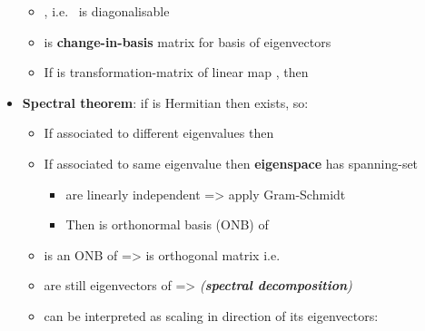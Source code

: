 \begin{itemize}
        \begin{itemize}

          \item
                , i.e.~ is diagonalisable
          \item
                 is \textbf{change-in-basis} matrix for
                basis
                 of
                eigenvectors
          \item
                If  is transformation-matrix of linear
                map , then
        \end{itemize}
  \item
        \textbf{Spectral theorem}: if  is Hermitian then
         exists, so:

        \begin{itemize}

          \item
                If  associated to different
                eigenvalues then 
          \item
                If associated to same eigenvalue \iMbox{\lambda} then
                \textbf{eigenspace}  has spanning-set

                \begin{itemize}

                  \item
                         are linearly
                        independent => apply Gram-Schmidt
                  \item
                        Then  is
                        orthonormal basis (ONB) of 
                \end{itemize}
          \item
                 is
                an ONB of  =>
                 is
                orthogonal matrix i.e.~
          \item
                 are still eigenvectors
                of  => 
                \emph{(\textbf{spectral decomposition})}
          \item
                 can be interpreted as scaling
                in direction of its eigenvectors:


\end{itemize}
\end{itemize}
